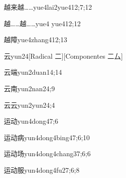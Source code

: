 \begin{verbete}{越来越……}{yue4lai2yue4}{12;7;12}
\end{verbete}

\begin{verbete}{越……越……}{yue4 yue4}{12;12}
\end{verbete}

\begin{verbete}{越障}{yue4zhang4}{12;13}
\end{verbete}

\begin{verbete}{云}{yun2}{4}[Radical 二][Componentes 二厶]
\end{verbete}

\begin{verbete}{云端}{yun2duan1}{4;14}
\end{verbete}

\begin{verbete}{云南}{yun2nan2}{4;9}
\end{verbete}

\begin{verbete}{云云}{yun2yun2}{4;4}
\end{verbete}

\begin{verbete}{运动}{yun4dong4}{7;6}
\end{verbete}

\begin{verbete}{运动病}{yun4dong4bing4}{7;6;10}
\end{verbete}

\begin{verbete}{运动场}{yun4dong4chang3}{7;6;6}
\end{verbete}

\begin{verbete}{运动服}{yun4dong4fu2}{7;6;8}
\end{verbete}

